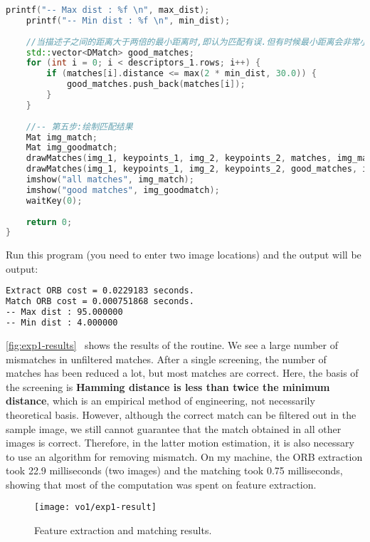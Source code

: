 \begin{lstlisting}[language=c++,caption=slambook2/ch7/orb_cv.cpp]
    printf("-- Max dist : %f \n", max_dist);
    printf("-- Min dist : %f \n", min_dist);
    
    //当描述子之间的距离大于两倍的最小距离时,即认为匹配有误.但有时候最小距离会非常小,设置一个经验值30作为下限.
    std::vector<DMatch> good_matches;
    for (int i = 0; i < descriptors_1.rows; i++) {
        if (matches[i].distance <= max(2 * min_dist, 30.0)) {
            good_matches.push_back(matches[i]);
        }
    }
    
    //-- 第五步:绘制匹配结果
    Mat img_match;
    Mat img_goodmatch;
    drawMatches(img_1, keypoints_1, img_2, keypoints_2, matches, img_match);
    drawMatches(img_1, keypoints_1, img_2, keypoints_2, good_matches, img_goodmatch);
    imshow("all matches", img_match);
    imshow("good matches", img_goodmatch);
    waitKey(0);
    
    return 0;
}
\end{lstlisting}
Run this program (you need to enter two image locations) and the output will be output:
\begin{lstlisting}[language=sh,caption=terminal input:]
% build/orb_cv 1.png 2.png
Extract ORB cost = 0.0229183 seconds.
Match ORB cost = 0.000751868 seconds.
-- Max dist : 95.000000
-- Min dist : 4.000000
\end{lstlisting}

\autoref{fig:exp1-results}~ shows the results of the routine. We see a large number of mismatches in unfiltered matches. After a single screening, the number of matches has been reduced a lot, but most matches are correct. Here, the basis of the screening is \textbf {Hamming distance is less than twice the minimum distance}, which is an empirical method of engineering, not necessarily theoretical basis. However, although the correct match can be filtered out in the sample image, we still cannot guarantee that the match obtained in all other images is correct. Therefore, in the latter motion estimation, it is also necessary to use an algorithm for removing mismatch. On my machine, the ORB extraction took 22.9 milliseconds (two images) and the matching took 0.75 milliseconds, showing that most of the computation was spent on feature extraction.

\begin{figure}[!htp]
\centering
\texttt{[image: vo1/exp1-result]}
\caption{Feature extraction and matching results. }
\label{fig:exp1-results}
\end{figure}

